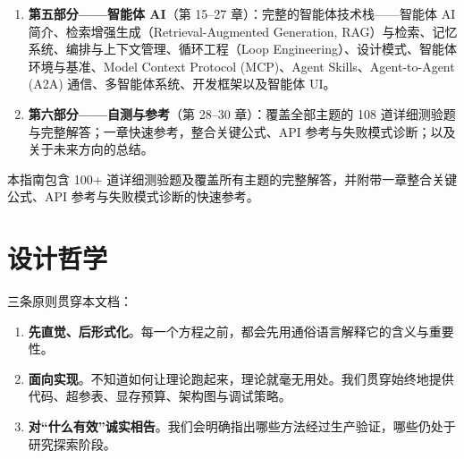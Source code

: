 \documentclass[11pt,a4paper,openany]{book}
\begin{document}
\begin{enumerate}
  \item \textbf{第五部分——智能体 AI}（第 15--27 章）：完整的智能体技术栈——智能体 AI 简介、检索增强生成（Retrieval-Augmented Generation, RAG）与检索、记忆系统、编排与上下文管理、循环工程（Loop Engineering）、设计模式、智能体环境与基准、Model Context Protocol (MCP)、Agent Skills、Agent-to-Agent (A2A) 通信、多智能体系统、开发框架以及智能体 UI。
  \item \textbf{第六部分——自测与参考}（第 28--30 章）：覆盖全部主题的 108 道详细测验题与完整解答；一章快速参考，整合关键公式、API 参考与失败模式诊断；以及关于未来方向的总结。
\end{enumerate}

本指南包含 100+ 道详细测验题及覆盖所有主题的完整解答，并附带一章整合关键公式、API 参考与失败模式诊断的快速参考。

\section*{设计哲学}
\label{design-philosophy}

三条原则贯穿本文档：

\begin{enumerate}
  \item \textbf{先直觉、后形式化}。每一个方程之前，都会先用通俗语言解释它的含义与重要性。
  \item \textbf{面向实现}。不知道如何让理论跑起来，理论就毫无用处。我们贯穿始终地提供代码、超参表、显存预算、架构图与调试策略。
  \item \textbf{对“什么有效”诚实相告}。我们会明确指出哪些方法经过生产验证，哪些仍处于研究探索阶段。
\end{enumerate}
\end{document}
